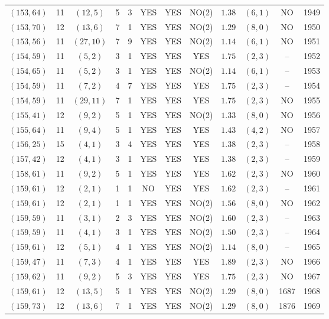 \begin{longtable}{|c|c|c|c|c|c|c|c|c|c|c|c|}
$(153,64)$ & 11 & $(12,5)$ & 5 & 3 & YES & YES & NO(2) & $1.38$ & $(6,1)$ & NO & 1949\\
$(153,70)$ & 12 & $(13,6)$ & 7 & 1 & YES & YES & NO(2) & $1.29$ & $(8,0)$ & NO & 1950\\
$(153,56)$ & 11 & $(27,10)$ & 7 & 9 & YES & YES & NO(2) & $1.14$ & $(6,1)$ & NO & 1951\\
$(154,59)$ & 11 & $(5,2)$ & 3 & 1 & YES & YES & YES & $1.75$ & $(2,3)$ & -- & 1952\\
$(154,65)$ & 11 & $(5,2)$ & 3 & 1 & YES & YES & NO(2) & $1.14$ & $(6,1)$ & -- & 1953\\
$(154,59)$ & 11 & $(7,2)$ & 4 & 7 & YES & YES & YES & $1.75$ & $(2,3)$ & -- & 1954\\
$(154,59)$ & 11 & $(29,11)$ & 7 & 1 & YES & YES & YES & $1.75$ & $(2,3)$ & NO & 1955\\
$(155,41)$ & 12 & $(9,2)$ & 5 & 1 & YES & YES & NO(2) & $1.33$ & $(8,0)$ & NO & 1956\\
$(155,64)$ & 11 & $(9,4)$ & 5 & 1 & YES & YES & YES & $1.43$ & $(4,2)$ & NO & 1957\\
$(156,25)$ & 15 & $(4,1)$ & 3 & 4 & YES & YES & YES & $1.38$ & $(2,3)$ & -- & 1958\\
$(157,42)$ & 12 & $(4,1)$ & 3 & 1 & YES & YES & YES & $1.38$ & $(2,3)$ & -- & 1959\\
$(158,61)$ & 11 & $(9,2)$ & 5 & 1 & YES & YES & YES & $1.62$ & $(2,3)$ & NO & 1960\\
$(159,61)$ & 12 & $(2,1)$ & 1 & 1 & NO & YES & YES & $1.62$ & $(2,3)$ & -- & 1961\\
$(159,61)$ & 12 & $(2,1)$ & 1 & 1 & YES & YES & NO(2) & $1.56$ & $(8,0)$ & NO & 1962\\
$(159,59)$ & 11 & $(3,1)$ & 2 & 3 & YES & YES & NO(2) & $1.60$ & $(2,3)$ & -- & 1963\\
$(159,59)$ & 11 & $(4,1)$ & 3 & 1 & YES & YES & NO(2) & $1.50$ & $(2,3)$ & -- & 1964\\
$(159,61)$ & 12 & $(5,1)$ & 4 & 1 & YES & YES & NO(2) & $1.14$ & $(8,0)$ & -- & 1965\\
$(159,47)$ & 11 & $(7,3)$ & 4 & 1 & YES & YES & YES & $1.89$ & $(2,3)$ & NO & 1966\\
$(159,62)$ & 11 & $(9,2)$ & 5 & 3 & YES & YES & YES & $1.75$ & $(2,3)$ & NO & 1967\\
$(159,61)$ & 12 & $(13,5)$ & 5 & 1 & YES & YES & NO(2) & $1.29$ & $(8,0)$ & 1687 & 1968\\
$(159,73)$ & 12 & $(13,6)$ & 7 & 1 & YES & YES & NO(2) & $1.29$ & $(8,0)$ & 1876 & 1969\\

\end{longtable}
